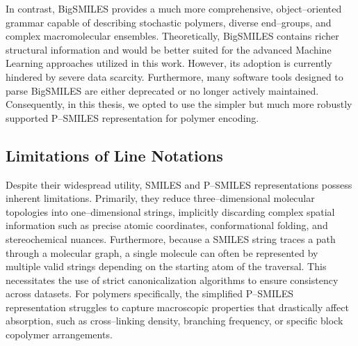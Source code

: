 In contrast, BigSMILES provides a much more comprehensive, object--oriented grammar capable of describing stochastic polymers, diverse end--groups, and complex macromolecular ensembles. Theoretically, BigSMILES contains richer structural information and would be better suited for the advanced Machine Learning approaches utilized in this work. However, its adoption is currently hindered by severe data scarcity. Furthermore, many software tools designed to parse BigSMILES are either deprecated or no longer actively maintained. Consequently, in this thesis, we opted to use the simpler but much more robustly supported P--SMILES representation for polymer encoding.

\subsection*{Limitations of Line Notations}
Despite their widespread utility, SMILES and P--SMILES representations possess inherent limitations. Primarily, they reduce three--dimensional molecular topologies into one--dimensional strings, implicitly discarding complex spatial information such as precise atomic coordinates, conformational folding, and stereochemical nuances. Furthermore, because a SMILES string traces a path through a molecular graph, a single molecule can often be represented by multiple valid strings depending on the starting atom of the traversal. This necessitates the use of strict canonicalization algorithms to ensure consistency across datasets. For polymers specifically, the simplified P--SMILES representation struggles to capture macroscopic properties that drastically affect absorption, such as cross--linking density, branching frequency, or specific block copolymer arrangements.


